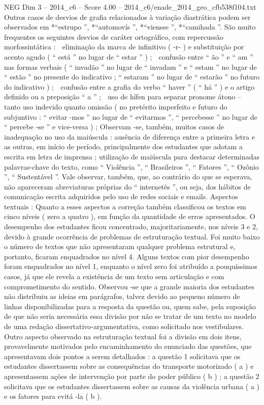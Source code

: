 \begin{textsample}{NEG Dim 3 – 2014\_c6 – Score 4.00 – 2014\_c6/enade\_2014\_geo\_cfb538f104.txt}
Outros casos de desvios de grafia relacionados à variação diastrática podem ser observados em *“estrupo ”, *“automovís ”, *“viensse ”, *“camihada ”.
São muito frequentes os seguintes desvios de caráter ortográfico, com repercussão morfossintática :  eliminação da marca de infinitivo ( -r- ) e substituição por acento agudo ( “ está ” no lugar de “ estar ” ) ;  confusão entre “ ão ” e “ am ” nas formas verbais ( “ invadão ” no lugar de “ invadam ” e “ estam ” no lugar de “ estão ” no presente do indicativo ; “ estaram ” no lugar de “ estarão ” no futuro do indicativo ) ;  confusão entre a grafia do verbo “ haver ” ( “ há ” ) e o artigo definido ou a preposição “ a ” ;  uso de hífen para separar pronome átono – tanto uso indevido quanto omissão ( no pretérito imperfeito e futuro do subjuntivo : “ evitar -mos ” no lugar de “ evitarmos ”, “ percebesse ” no lugar de “ percebe -se ” e vice-versa ) ; Observam -se, também, muitos casos de inadequação no uso da maiúscula : ausência de diferença entre a primeira letra e as outras, em início de período, principalmente dos estudantes que adotam a escrita em letra de imprensa ; utilização de maiúscula para destacar determinadas palavras-chave do texto, como “ Violência ”, “ Brasileiros ”, “ Fatores ”, “ Ozônio ”, “ Sustentável ”.
Vale observar, também, que, ao contrário do que se esperava, não apareceram abreviaturas próprias do “ internetês ”, ou seja, dos hábitos de comunicação escrita adquiridos pelo uso de redes sociais e emails.
Aspectos textuais : Quanto a esses aspectos a correção também classificou os textos em cinco níveis ( zero a quatro ), em função da quantidade de erros apresentados.
O desempenho dos estudantes ficou concentrado, majoritariamente, nos níveis 3 e 2, devido à grande ocorrência de problemas de estruturação textual.
Foi muito baixo o número de textos que não apresentaram qualquer problema estrutural e, portanto, ficaram enquadrados no nível 4.
Alguns textos com pior desempenho foram enquadrados no nível 1, enquanto o nível zero foi atribuído a pouquíssimos casos, já que ele revela a existência de um texto sem articulação e com comprometimento do sentido.
Observou -se que a grande maioria dos estudantes não distribuiu as ideias em parágrafos, talvez devido ao pequeno número de linhas disponibilizadas para a resposta da questão ou, quem sabe, pela suposição de que não seria necessária essa divisão por não se tratar de um texto no modelo de uma redação dissertativo-argumentativa, como solicitado nos vestibulares.
Outro aspecto observado na estruturação textual foi a divisão em dois itens, provavelmente motivados pelo encaminhamento do enunciado das questões, que apresentavam dois pontos a serem detalhados : a questão 1 solicitava que os estudantes dissertassem sobre as consequências do transporte motorizado ( a ) e apresentassem ações de intervenção por parte do poder público ( b ) ; a questão 2 solicitava que os estudantes dissertassem sobre as causas da violência urbana ( a ) e os fatores para evitá -la ( b ).

\end{textsample}
